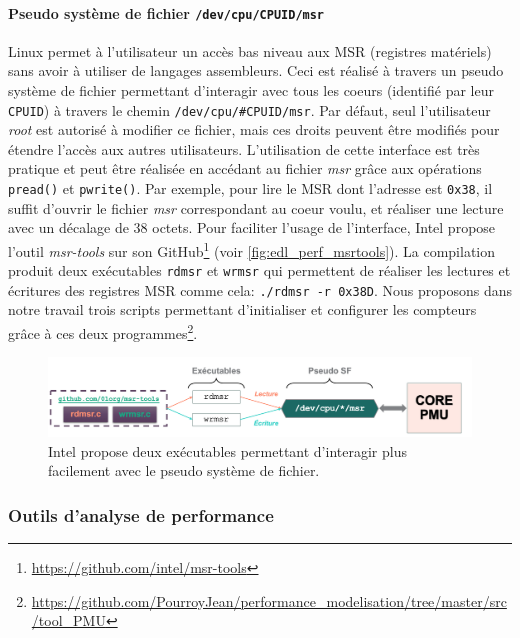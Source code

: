         \paragraph{Pseudo système de fichier \texttt{/dev/cpu/CPUID/msr}}\label{sec:edl_profiling_dev_cpu}
            
            Linux permet à l'utilisateur un accès bas niveau aux MSR (registres matériels) sans avoir à utiliser de langages assembleurs. Ceci est réalisé à travers un pseudo système de fichier permettant d'interagir avec tous les coeurs (identifié par leur \verb|CPUID|) à travers le chemin \verb|/dev/cpu/#CPUID/msr|. Par défaut, seul l'utilisateur \textit{root} est autorisé à modifier ce fichier, mais ces droits peuvent être modifiés pour étendre l'accès aux autres utilisateurs. L'utilisation de cette interface est très pratique et peut être réalisée en accédant au fichier \textit{msr} grâce aux opérations \verb|pread()| et \verb|pwrite()|. Par exemple, pour lire le MSR dont l'adresse est \verb|0x38|, il suffit d'ouvrir le fichier \textit{msr} correspondant au coeur voulu, et réaliser une lecture avec un décalage de 38 octets. Pour faciliter l'usage de l'interface, Intel propose l'outil \textit{msr-tools} sur son GitHub\footnote{\url{https://github.com/intel/msr-tools}} (voir \autoref{fig:edl_perf_msrtools}).  La compilation produit deux exécutables \verb|rdmsr| et \verb|wrmsr| qui permettent de réaliser les lectures et écritures des registres MSR comme cela: \verb|./rdmsr -r 0x38D|. Nous proposons dans notre travail trois scripts permettant d'initialiser et configurer les compteurs grâce à ces deux programmes\footnote{\url{https://github.com/PourroyJean/performance_modelisation/tree/master/src/tool_PMU}}. 

            
            \begin{figure}[ht!]
            \center
            \includegraphics[width=16cm]{images/edl_perf_msrtools.png}
            \caption{\label{fig:edl_perf_msrtools} Intel propose deux exécutables permettant d'interagir plus facilement avec le pseudo système de fichier.}
            \end{figure}


    \subsubsection{Outils d'analyse de performance}
    
